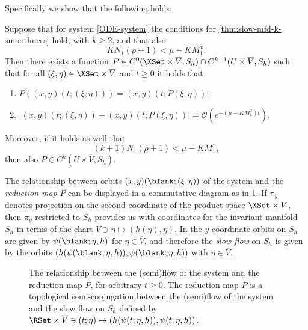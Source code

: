 \documentclass[a4paper]{siamart190516}
\begin{document}
Specifically we show that the following holds:
 
 \begin{theorem}\label{thm:red-principle-slow-mfd}
 Suppose that for system \cref{ODE-system} the conditions for
 \cref{thm:slow-mfd-k-smoothness} hold, with $k \geq 2$, and that also
 \[
 K N_1(\rho + 1) < \mu - K M^x_1.
 \]
 Then there exists a function $P \in C^0(\XSet \times \overline{V}, S_h) \cap C^{k-1}(U \times \overline{V}, S_h)$ such that for all $(\xi,\eta) \in \XSet \times \overline{V}$ and $t \geq 0$ it holds that
 \begin{enumerate}
 \item $P((x,y)(t; (\xi,\eta))) = (x,y)(t; P(\xi,\eta))$;
 \item $| (x,y)(t; (\xi,\eta)) - (x,y)(t; P(\xi,\eta)) | = \mathcal{O}\left(e^{-(\mu-K M^x_1) t}\right).$
 \end{enumerate}
 Moreover, if it holds as well that
 \[
 (k+1) N_1(\rho + 1) < \mu - K M^x_1,
 \]
 then also $P \in C^k(U \times \overline{V}, S_h)$. 
 \end{theorem}
 
 The relationship between orbits $(x,y)(\blank ; (\xi,\eta))$ of the system and the
 \textit{reduction map} $P$ can be displayed in a commutative diagram as in
 \cref{fig:com-dia-red-map}. If $\pi_y$ denotes projection on the second coordinate
 of the product space $\XSet \times {V}$, then $\pi_y$ restricted to $S_h$ provides
 us with coordinates for the invariant manifold $S_h$ in terms of the chart $\overline{V}
 \ni \eta \mapsto (h(\eta), \eta)$.
  In the $y$-coordinate orbits on $S_h$ are given by $\psi(\blank; \eta, h)$ for $\eta \in \overline{V}$, and therefore the \textit{slow flow} on $S_h$ is given by the orbits $(h(\psi(\blank; \eta,h)), \psi(\blank; \eta,h))$ with $\eta \in \overline{V}$. 
 
 \begin{figure}\label{fig:com-dia-red-map}\centering
{}
\caption{The relationship between the (semi)flow of the system and the reduction map $P$, for arbitrary $t \geq 0$. The reduction map $P$ is a topological semi-conjugation between the (semi)flow of the system and the slow flow on $S_h$ defined by $\RSet \times \overline{V} \ni (t; \eta) \mapsto (h(\psi(t; \eta, h)),\psi(t; \eta, h))$.}
\end{figure}
 
\end{document}
